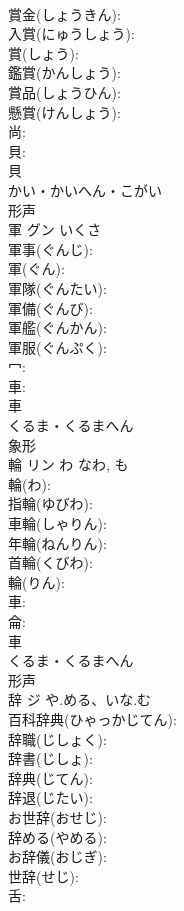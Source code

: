 \documentclass[8pt]{extreport}
\begin{document}
\begin{CJK}{UTF8}{min}
\\	賞金(しょうきん): 
\\	入賞(にゅうしょう): 
\\	賞(しょう): 
\\	鑑賞(かんしょう): 
\\	賞品(しょうひん): 
\\	懸賞(けんしょう): 
\\	尚: 
\\	貝: 
\\	貝	
\\	かい・かいへん・こがい	
\\	形声 
\\	軍	グン	いくさ		
\\	軍事(ぐんじ): 
\\	軍(ぐん): 
\\	軍隊(ぐんたい): 
\\	軍備(ぐんび): 
\\	軍艦(ぐんかん): 
\\	軍服(ぐんぷく): 
\\	冖: 
\\	車: 
\\	車	
\\	くるま・くるまへん	
\\	象形 
\\	輪	リン	わ	なわ, も	
\\	輪(わ): 
\\	指輪(ゆびわ): 
\\	車輪(しゃりん): 
\\	年輪(ねんりん): 
\\	首輪(くびわ): 
\\	輪(りん): 
\\	車: 
\\	侖: 
\\	車	
\\	くるま・くるまへん	
\\	形声 
\\	辞	ジ	や.める、いな.む		
\\	百科辞典(ひゃっかじてん): 
\\	辞職(じしょく): 
\\	辞書(じしょ): 
\\	辞典(じてん): 
\\	辞退(じたい): 
\\	お世辞(おせじ): 
\\	辞める(やめる): 
\\	お辞儀(おじぎ): 
\\	世辞(せじ): 
\\	舌: 

\end{CJK}
\end{document}
